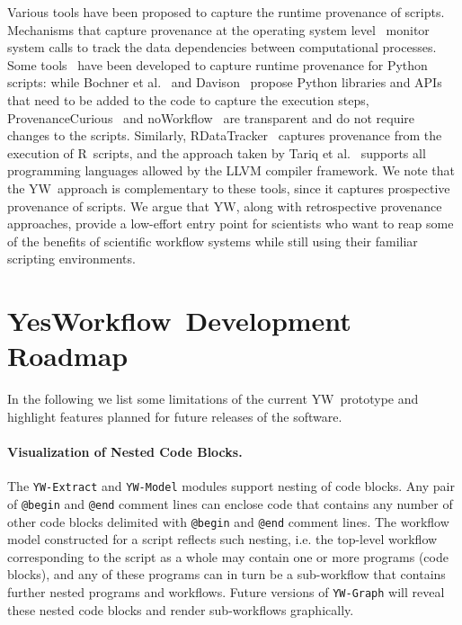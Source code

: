 \documentclass{article}
\newcommand{\yw}{\textsf{YW}}
\newcommand{\YWT}{\textsf{YesWorkflow}}
\newcommand{\ywa}[1]{\texttt{#1}}
\newcommand{\ywm}[1]{\texttt{#1}}
\newcommand{\R}{\textsf{R}}
\begin{document}
Various tools have been proposed to capture the runtime provenance of
scripts. Mechanisms that capture provenance at the operating system
level~\cite{frew2008Automatic,guo2012BURRITO,muniswamy2006Provenance}
monitor system calls to track the data dependencies between
computational processes. Some
tools~\cite{bochner2008Python,davison2012Automated,huq2013ProvenanceCurious,murta2014noWorkflow}
have been developed to capture runtime provenance for Python scripts:
while Bochner et al.~\cite{bochner2008Python} and
Davison~\cite{davison2012Automated} propose Python libraries and APIs
that need to be added to the code to capture the execution steps,
ProvenanceCurious~\cite{huq2013ProvenanceCurious} and
noWorkflow~\cite{murta2014noWorkflow} are transparent and do not
require changes to the scripts. Similarly,
RDataTracker~\cite{Lerner2014RDataTracker} captures provenance from
the execution of \R\ scripts, and the approach taken by Tariq et
al.~\cite{Tariq2012Towards} supports all programming languages allowed
by the LLVM compiler framework. We note that the \yw\ approach is
complementary to these tools, since it captures prospective provenance
of scripts. We argue that \yw, along with retrospective provenance
approaches, provide a low-effort entry point for scientists who want
to reap some of the benefits of scientific workflow systems while
still using their familiar scripting environments.


\section{\YWT\ Development Roadmap}\label{sec-conclusions}

In the following we list some limitations of the current \yw\
prototype and highlight features planned for future
releases of the software.

\paragraph{Visualization of Nested Code Blocks.}
The \ywm{YW-Extract} and \ywm{YW-Model} modules support
 nesting of code blocks. Any pair of \ywa{@begin} and \ywa{@end}
comment lines can enclose code that contains any number of other code
blocks delimited with \ywa{@begin} and \ywa{@end} comment lines.
The workflow model constructed for a script reflects such nesting, i.e.
the top-level workflow corresponding to the script as a whole may contain 
one or more programs (code blocks), and any of these programs can in turn be a 
sub-workflow that contains further nested programs and workflows.
Future versions of \ywm{YW-Graph} will reveal these nested code blocks 
and render sub-workflows graphically.
\end{document}
